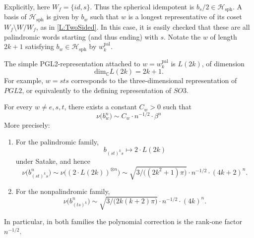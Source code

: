 \documentclass[a4paper,11pt]{amsart}
\newcommand{\C}{\mathbb{C}}
\renewcommand{\dim}[1][\C]{\mathrm{dim}_{#1}}
\newcommand{\Hecke}{\mc H}
\newcommand{\nuop}{\nu}
\newcommand{\mc}{\mathcal}
\numberwithin{equation}{subsection}
\theoremstyle{definition}
\theoremstyle{remark}
\begin{document}
Explicitly, here $W_f=\{id,s\}$. Thus the spherical idempotent is
$b_s/2\in \Hecke_{\mathrm{sph}}$. A basis of $\Hecke_{\mathrm{sph}}$ is given by $b_w$ such that $w$ is a longest representative of its coset $W_f\setminus W / W_f$, as in \autoref{L:TwoSided}. In this case, it is easily checked that these are all palindromic words starting (and thus ending) with $s$. Notate the $w$ of length $2k+1$ satisfying $b_w \in \Hecke_{\mathrm{sph}}$ by $w_k^{\mathrm{pal}}$.

The simple PGL2-representation attached to
$w=w_k^{\mathrm{pal}}$ is $L(2k)$, of dimension
\[
\dim L(2k)=2k+1.
\]
For example, $w=sts$ corresponds to the three-dimensional representation of
\(PGL2\), or equivalently to the defining representation of
$SO3$.

\begin{Theorem}\label{thm:a1exact}
For every $w\neq e,s,t$, there exists a constant $C_w>0$ such that
\[
\nuop\bigl(b_{w}^n\bigr)\sim C_w\cdot n^{-1/2}\cdot\beta^n
\]
More precisely:
\begin{enumerate}
\item For the palindromic family,
\[
b_{(st)^ks}\longmapsto 2\cdot L(2k)
\]
under Satake, and hence
\[
\nuop\bigl(b_{(st)^ks}^n\bigr)
\sim
\nuop\bigl((2\cdot L(2k))^{\otimes n}\bigr)
\sim
\sqrt{3/\big((2k^2+1)\pi\big)}\cdot n^{-1/2}\cdot (4k+2)^n.
\]

\item For the nonpalindromic family,
\[
\nuop\bigl(b_{(ts)^k}^n\bigr)
\sim
\sqrt{3/\big(2k(k+2)\pi\big)}\cdot n^{-1/2}\cdot (4k)^n.
\]
\end{enumerate}
In particular, in both families the polynomial correction is the rank-one
factor $n^{-1/2}$.
\end{Theorem}
\end{document}
